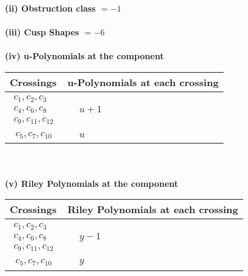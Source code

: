 \documentclass[1p]{elsarticle_modified}
\theoremstyle{definition}
\begin{document}
\flushleft \textbf{(ii) Obstruction class $= -1$}\\~\\
\flushleft \textbf{(iii) Cusp Shapes $= -6$}\\~\\
\newpage\renewcommand{\arraystretch}{1}
\flushleft \textbf{(iv) u-Polynomials at the component}\newline \\
\begin{tabular}{m{50pt}|m{274pt}}
Crossings & \hspace{64pt}u-Polynomials at each crossing \\
\hline $$\begin{aligned}c_{1},c_{2},c_{3}\\c_{4},c_{6},c_{8}\\c_{9},c_{11},c_{12}\end{aligned}$$&$\begin{aligned}
&u+1
\end{aligned}$\\
\hline $$\begin{aligned}c_{5},c_{7},c_{10}\end{aligned}$$&$\begin{aligned}
&u
\end{aligned}$\\
\hline
\end{tabular}\\~\\
\newpage\renewcommand{\arraystretch}{1}
\flushleft \textbf{(v) Riley Polynomials at the component}\newline \\
\begin{tabular}{m{50pt}|m{274pt}}
Crossings & \hspace{64pt}Riley Polynomials at each crossing \\
\hline $$\begin{aligned}c_{1},c_{2},c_{3}\\c_{4},c_{6},c_{8}\\c_{9},c_{11},c_{12}\end{aligned}$$&$\begin{aligned}
&y-1
\end{aligned}$\\
\hline $$\begin{aligned}c_{5},c_{7},c_{10}\end{aligned}$$&$\begin{aligned}
&y
\end{aligned}$\\
\hline
\end{tabular}\\~\\
\end{document}
